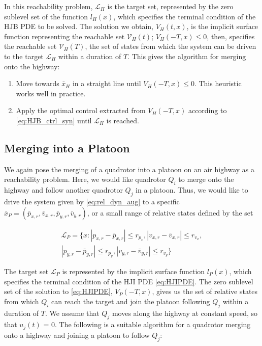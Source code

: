 In this reachability problem, $\mathcal{L}_H$ is the target set, represented by the zero sublevel set of the function $l_H(x)$, which specifies the terminal condition of the HJB PDE to be solved. The solution we obtain, $V_H(t,x)$, is the implicit surface function representing the reachable set $\mathcal V_H(t)$; $V_H(-T,x)\le 0$, then, specifies the reachable set $\mathcal{V}_H(T)$, the set of states from which the system can be driven to the target $\mathcal{L}_H$ within a duration of $T$. This gives the algorithm for merging onto the highway:

\begin{enumerate}
\item Move towards $\bar{x}_H$ in a straight line until $V_H(-T,x)\le 0$. This heuristic works well in practice. 
\item Apply the optimal control extracted from $V_H(-T,x)$ according to \eqref{eq:HJB_ctrl_syn} until $\mathcal{L}_H$ is reached.
\end{enumerate}

\subsection{Merging into a Platoon \label{subsec:platoon_merge}}
We again pose the merging of a quadrotor into a platoon on an air highway as a reachability problem. Here, we would like quadrotor $Q_i$ to merge onto the highway and follow another quadrotor $Q_j$ in a platoon. Thus, we would like to drive the system given by \eqref{eq:rel_dyn_aug} to a specific $\bar{x}_P = (\bar{p}_{x,r}, \bar{v}_{x,r}, \bar{p}_{y,r}, \bar{v}_{y,r})$, or a small range of relative states defined by the set

\begin{equation}
\begin{aligned}
\mathcal{L}_P = \{x: |p_{x,r}-\bar{p}_{x,r}|\le r_{p_x}, |v_{x,r}-\bar{v}_{x,r}|\le r_{v_x}, \\
|p_{y,r} - \bar{p}_{y,r}| \le r_{p_y}, |v_{y,r} - \bar{v}_{y,r}|\le r_{v_y} \}
\end{aligned}
\end{equation}

The target set $\mathcal{L}_P$ is represented by the implicit surface function $l_P(x)$, which specifies the terminal condition of the HJI PDE \eqref{eq:HJIPDE}. The zero sublevel set of the solution to \eqref{eq:HJIPDE}, $V_P(-T,x)$, gives us the set of relative states from which $Q_i$ can reach the target and join the platoon following $Q_j$ within a duration of $T$. We assume that $Q_j$ moves along the highway at constant speed, so that $u_j(t)$ = 0. The following is a suitable algorithm for a quadrotor merging onto a highway and joining a platoon to follow $Q_j$:

